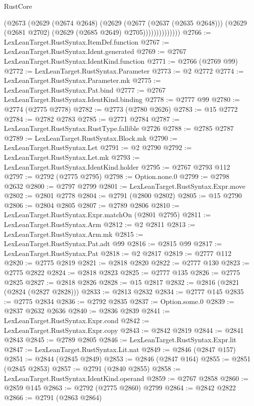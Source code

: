 \begin{lexlean}{RustCore}
\begin{coremodule}
                      (@2673
                        (@2629
                          (@2674 @2648)
                          (@2629
                            (@2677 (@2637 (@2635 @2648)))
                            (@2629 (@2681 @2702) (@2629 (@2685 @2649) @2705))))))))))))))
@2766 := LexLeanTarget.RustSyntax.ItemDef.function
@2767 := LexLeanTarget.RustSyntax.Ident.generated
@2769 := @2767 LexLeanTarget.RustSyntax.IdentKind.function
@2771 := @2766 (@2769 @99)
@2772 := LexLeanTarget.RustSyntax.Parameter
@2773 := @2 @2772
@2774 := LexLeanTarget.RustSyntax.Parameter.mk
@2775 := LexLeanTarget.RustSyntax.Pat.bind
@2777 := @2767 LexLeanTarget.RustSyntax.IdentKind.binding
@2778 := @2777 @99
@2780 := @2774 (@2775 @2778)
@2782 := @2773 (@2780 @2626)
@2783 := @15 @2772
@2784 := @2782 @2783
@2785 := @2771 @2784
@2787 := LexLeanTarget.RustSyntax.RustType.fallible @2726
@2788 := @2785 @2787
@2789 := LexLeanTarget.RustSyntax.Block.mk
@2790 := LexLeanTarget.RustSyntax.Let
@2791 := @2 @2790
@2792 := LexLeanTarget.RustSyntax.Let.mk
@2793 := LexLeanTarget.RustSyntax.IdentKind.holder
@2795 := @2767 @2793 @112
@2797 := @2792 (@2775 @2795)
@2798 := Option.none.{0}
@2799 := @2798 @2632
@2800 := @2797 @2799
@2801 := LexLeanTarget.RustSyntax.Expr.move
@2802 := @2801 @2778
@2804 := @2791 (@2800 @2802)
@2805 := @15 @2790
@2806 := @2804 @2805
@2807 := @2789 @2806
@2810 := LexLeanTarget.RustSyntax.Expr.matchOn (@2801 @2795)
@2811 := LexLeanTarget.RustSyntax.Arm
@2812 := @2 @2811
@2813 := LexLeanTarget.RustSyntax.Arm.mk
@2815 := LexLeanTarget.RustSyntax.Pat.adt @99
@2816 := @2815 @99
@2817 := LexLeanTarget.RustSyntax.Pat
@2818 := @2 @2817
@2819 := @2777 @112
@2820 := @2775 @2819
@2821 := @2818 @2820
@2822 := @2777 @130
@2823 := @2775 @2822
@2824 := @2818 @2823
@2825 := @2777 @135
@2826 := @2775 @2825
@2827 := @2818 @2826
@2828 := @15 @2817
@2832 := @2816 (@2821 (@2824 (@2827 @2828)))
@2833 := @2813 @2832
@2834 := @2777 @145
@2835 := @2775 @2834
@2836 := @2792 @2835
@2837 := Option.some.{0}
@2839 := @2837 @2632 @2636
@2840 := @2836 @2839
@2841 := LexLeanTarget.RustSyntax.Expr.cond
@2842 := LexLeanTarget.RustSyntax.Expr.copy
@2843 := @2842 @2819
@2844 := @2841 @2843
@2845 := @2789 @2805
@2846 := LexLeanTarget.RustSyntax.Expr.lit
@2847 := LexLeanTarget.RustSyntax.Lit.nat
@2849 := @2846 (@2847 @157)
@2851 := @2844 (@2845 @2849)
@2853 := @2846 (@2847 @164)
@2855 := @2851 (@2845 @2853)
@2857 := @2791 (@2840 @2855)
@2858 := LexLeanTarget.RustSyntax.IdentKind.operand
@2859 := @2767 @2858
@2860 := @2859 @145
@2863 := @2792 (@2775 @2860) @2799
@2864 := @2842 @2822
@2866 := @2791 (@2863 @2864)

\end{coremodule}
\end{lexlean}
